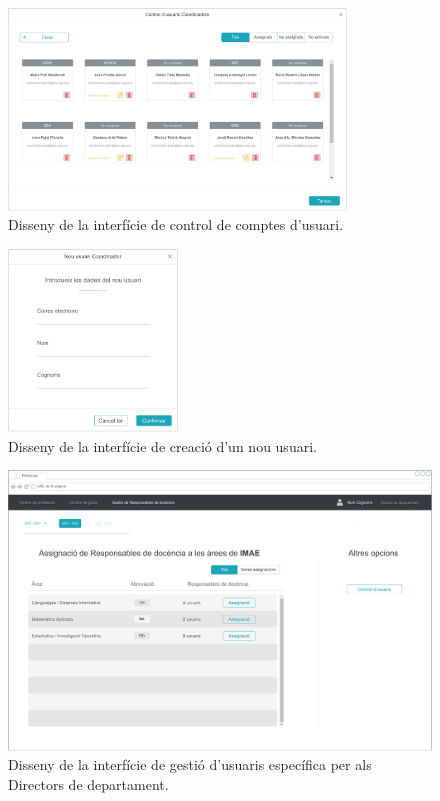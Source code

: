 \documentclass[a4paper,12pt]{ThesisStyle}
\begin{document}
\begin{figure}[H]
	\centering
	\includegraphics[width=0.8\textwidth]{assets/interfaces/administradors/gestCoords/gestUsuarisDialog.pdf}
	\caption{\label{img:gestCoords_gestUsuarisDialog}Disseny de la interfície de control de comptes d'usuari.}
\end{figure}

\begin{figure}[H]
	\centering
	\includegraphics[width=0.4\textwidth]{assets/interfaces/administradors/gestCoords/nouUsuariDialog.pdf}
	\caption{\label{img:gestCoords_nouUsuariDialog}Disseny de la interfície de creació d'un nou usuari.}
\end{figure}

\begin{figure}[H]
	\centering
	\includegraphics[width=\textwidth]{assets/interfaces/directors/gestResp/main.pdf}
	\caption{\label{img:gestResp_main}Disseny de la interfície de gestió d'usuaris específica per als Directors de departament.}
\end{figure}
\end{document}
